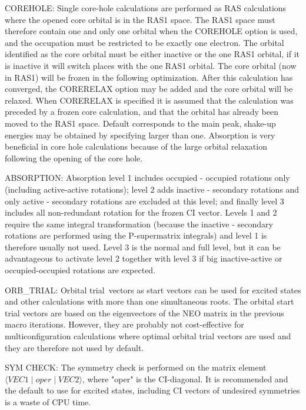 
COREHOLE: Single core-hole calculations are
performed as RAS calculations where the opened core orbital is in
the RAS1 space.  The RAS1 space must therefore contain one and
only one orbital when the COREHOLE option is used, and the
occupation must be restricted to be exactly one electron. The
orbital identified as the core orbital must be either inactive or
the one RAS1 orbital, if it is inactive it will switch places with
the one RAS1 orbital. The core orbital (now in RAS1) will be
frozen in the following optimization. After this calculation has
converged, the CORERELAX option may be added and the core orbital
will be relaxed.  When CORERELAX is
specified it is assumed that the calculation was preceded by a
frozen core calculation, and that the
orbital has already been moved to the RAS1 space. Default
corresponds to the main peak, shake-up energies may be obtained by
specifying  larger than one. Absorption is
very beneficial in core hole calculations because of the large
orbital relaxation following the opening of the core hole.

ABSORPTION: Absorption level 1 includes occupied - occupied rotations
only (including active-active rotations); level 2 adds inactive -
secondary rotations and only active - secondary rotations are excluded
at this level; and finally level 3 includes all non-redundant rotation
for the frozen CI vector.  Levels 1 and 2 require the same integral
transformation (because the inactive - secondary rotations are
performed using the P-supermatrix integrals) and level 1 is therefore
usually not used. Level 3 is the normal and full level, but it can be
advantageous to activate level 2 together with level 3 if big
inactive-active or occupied-occupied rotations are expected.

ORB\_TRIAL: Orbital trial\ vectors as
start vectors can be used for
excited states and other calculations with more than one simultaneous
roots.  The orbital start trial vectors are based on the eigenvectors of
the NEO matrix in the previous macro iterations.  However, they are
probably not cost-effective for multiconfiguration calculations where
optimal orbital trial vectors are
used and they are therefore not used
by default.

SYM CHECK: The symmetry check is performed on the matrix element
$\langle VEC1 \mid oper \mid VEC2\rangle$, where "oper" is
the CI-diagonal.
It is recommended and the default to use 
for excited states, including
CI vectors of undesired symmetries is a waste of CPU time.

